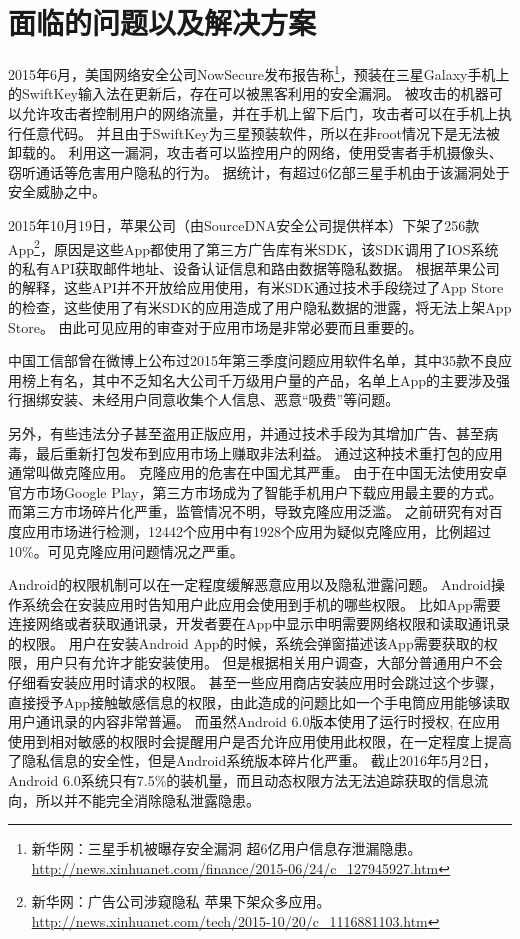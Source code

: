 \section{面临的问题以及解决方案}
\label{sec:market-prob}
2015年6月，美国网络安全公司NowSecure发布报告称\footnote{新华网：三星手机被曝存安全漏洞 超6亿用户信息存泄漏隐患。 \url{http://news.xinhuanet.com/finance/2015-06/24/c_127945927.htm}}，预装在三星Galaxy手机上的SwiftKey输入法在更新后，存在可以被黑客利用的安全漏洞。
被攻击的机器可以允许攻击者控制用户的网络流量，并在手机上留下后门，攻击者可以在手机上执行任意代码。
并且由于SwiftKey为三星预装软件，所以在非root情况下是无法被卸载的。
利用这一漏洞，攻击者可以监控用户的网络，使用受害者手机摄像头、窃听通话等危害用户隐私的行为。
据统计，有超过6亿部三星手机由于该漏洞处于安全威胁之中。


2015年10月19日，苹果公司（由SourceDNA安全公司提供样本）下架了256款App\footnote{新华网：广告公司涉窥隐私 苹果下架众多应用。 \url{http://news.xinhuanet.com/tech/2015-10/20/c_1116881103.htm}}，原因是这些App都使用了第三方广告库有米SDK，该SDK调用了IOS系统的私有API获取邮件地址、设备认证信息和路由数据等隐私数据。
根据苹果公司的解释，这些API并不开放给应用使用，有米SDK通过技术手段绕过了App Store的检查，这些使用了有米SDK的应用造成了用户隐私数据的泄露，将无法上架App Store。
由此可见应用的审查对于应用市场是非常必要而且重要的。


中国工信部曾在微博上公布过2015年第三季度问题应用软件名单，其中35款不良应用榜上有名，其中不乏知名大公司千万级用户量的产品，名单上App的主要涉及强行捆绑安装、未经用户同意收集个人信息、恶意“吸费”等问题。

另外，有些违法分子甚至盗用正版应用，并通过技术手段为其增加广告、甚至病毒，最后重新打包发布到应用市场上赚取非法利益。
通过这种技术重打包的应用通常叫做克隆应用。
克隆应用的危害在中国尤其严重。
由于在中国无法使用安卓官方市场Google Play，第三方市场成为了智能手机用户下载应用最主要的方式。
而第三方市场碎片化严重，监管情况不明，导致克隆应用泛滥。
之前研究有对百度应用市场进行检测，12442个应用中有1928个应用为疑似克隆应用，比例超过10\%。可见克隆应用问题情况之严重。

Android的权限机制可以在一定程度缓解恶意应用以及隐私泄露问题。
Android操作系统会在安装应用时告知用户此应用会使用到手机的哪些权限。
比如App需要连接网络或者获取通讯录，开发者要在App中显示申明需要网络权限和读取通讯录的权限。
用户在安装Android App的时候，系统会弹窗描述该App需要获取的权限，用户只有允许才能安装使用。
但是根据相关用户调查，大部分普通用户不会仔细看安装应用时请求的权限。
甚至一些应用商店安装应用时会跳过这个步骤，直接授予App接触敏感信息的权限，由此造成的问题比如一个手电筒应用能够读取用户通讯录的内容非常普遍。
而虽然Android 6.0版本使用了运行时授权, 在应用使用到相对敏感的权限时会提醒用户是否允许应用使用此权限，在一定程度上提高了隐私信息的安全性，但是Android系统版本碎片化严重。
截止2016年5月2日，Android 6.0系统只有7.5\%的装机量，而且动态权限方法无法追踪获取的信息流向，所以并不能完全消除隐私泄露隐患。

